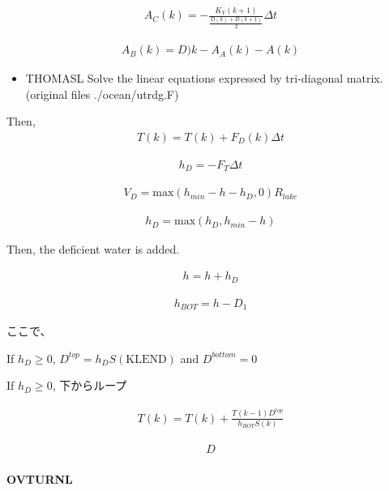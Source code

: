 \begin{eqnarray}
    A_C(k) = -\frac{K_V(k+1)}{\frac{D(k)+D(k+1)}{2}} \Delta t
\end{eqnarray}

\begin{eqnarray}
    A_B(k) = D)k-A_A(k)-A(k)
\end{eqnarray}

\begin{itemize}
\tightlist
\item
  THOMASL Solve the linear equations expressed by tri-diagonal matrix.
  (original files ./ocean/utrdg.F)
\end{itemize}

Then, \begin{eqnarray}
    T(k)=T(k)+ F_D(k)\Delta t
\end{eqnarray}

\begin{eqnarray}
    h_D = -F_T \Delta t
\end{eqnarray}

\begin{eqnarray}
    V_D = \mathrm{max}(h_{min}-h - h_D, 0) R_{lake}
\end{eqnarray}

\begin{eqnarray}
    h_D = \mathrm{max}(h_D,h_{min}-h)
\end{eqnarray}

Then, the deficient water is added.

\begin{eqnarray}
    h = h + h_D
\end{eqnarray}

\begin{eqnarray}
    h_{BOT}=h-D_1
\end{eqnarray}

ここで、

If \(h_D\ge0\), \(D^{top}=h_D S(\mathrm{KLEND})\) and \(D^{bottom}=0\)

If \(h_D\ge0\), 下からループ

\begin{eqnarray}
    T(k) = T(k) + \frac{  T(k-1) D^{top}}{h_{BOT}S(k)}
\end{eqnarray}

\begin{eqnarray}
    D
\end{eqnarray}

\hypertarget{ovturnl}{%
\paragraph{OVTURNL}\label{ovturnl}}

